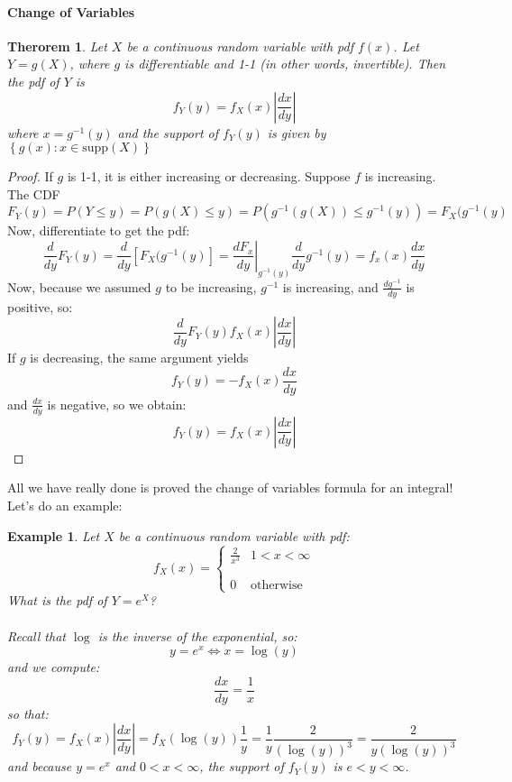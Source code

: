 \documentclass[12pt]{article} %
\newcommand{\pdf}[2]{\left\{\begin{matrix}
{#1} & {#2}\\\\\\0&\textrm{otherwise}
\end{matrix}\right.}
\newtheorem{example}{Example}
\newtheorem{thm}{Therorem}
\begin{document}
\paragraph{Change of Variables}
\begin{thm}
Let $X$ be a continuous random variable with pdf $f(x)$. Let $Y=g(X)$, where $g$ is differentiable and 1-1 (in other words, invertible). Then the pdf of $Y$ is
$$f_Y(y)= f_X(x)\left|\frac{dx}{dy}\right|$$
where $x=g^{-1}(y)$ and the support of $f_Y(y)$ is given by $\left\{g(x): x\in \mathrm{supp}(X)\right\}$
\end{thm} 
\begin{proof}
If $g$ is 1-1, it is either increasing or decreasing. Suppose $f$ is increasing. The CDF
$$F_Y(y) = P(Y\leq y) = P(g(X)\leq y) = P(g^{-1}(g(X))\leq g^{-1}(y)) = F_X(g^{-1}(y)$$
Now, differentiate to get the pdf:
$$\frac{d}{dy} F_Y(y) = \frac{d}{dy} \left[F_X(g^{-1}(y)\right] = \left.\frac{dF_x}{dy}\right\rvert_{g^{-1}(y)} \frac{d}{dy} g^{-1}(y) = f_x(x) \frac{dx}{dy}$$
Now, because we assumed $g$ to be increasing, $g^{-1}$ is increasing, and $\frac{dg^{-1}}{dy}$ is positive, so:
$$\frac{d}{dy} F_Y(y)f_X(x)\left|\frac{dx}{dy}\right|$$
If $g$ is decreasing, the same argument yields 
$$f_Y(y) = -f_X(x)\frac{dx}{dy}$$
and $\frac{dx}{dy}$ is negative, so we obtain:
$$f_Y(y) = f_X(x)\left|\frac{dx}{dy}\right|$$
\end{proof}
All we have really done is proved the change of variables formula for an integral! Let's do an example:
\begin{example}
Let $X$ be a continuous random variable with pdf:
$$f_X(x) = \pdf{\frac{2}{x^3}}{1<x<\infty}$$
What is the pdf of $Y=e^X$?\\\\
Recall that $\log$ is the inverse of the exponential, so:
$$y=e^x\iff x=\log(y)$$
and we compute:
$$\frac{dx}{dy} = \frac1x$$
so that:
$$f_Y(y) = f_X(x)\left|\frac{dx}{dy}\right| = f_X(\log(y))\frac1y = \frac1y\frac2{\left(\log(y)\right)^3} = \frac2{y\left(\log(y)\right)^3}$$
and because $y=e^x$ and $0<x<\infty$, the support of $f_Y(y)$ is $e<y<\infty$.
\end{example}
\end{document}
